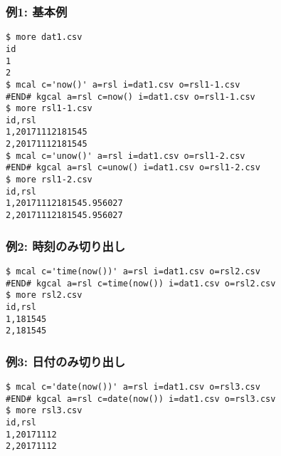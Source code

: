 \subsubsection*{例1: 基本例}



\begin{Verbatim}[baselinestretch=0.7,frame=single]
$ more dat1.csv
id
1
2
$ mcal c='now()' a=rsl i=dat1.csv o=rsl1-1.csv
#END# kgcal a=rsl c=now() i=dat1.csv o=rsl1-1.csv
$ more rsl1-1.csv
id,rsl
1,20171112181545
2,20171112181545
$ mcal c='unow()' a=rsl i=dat1.csv o=rsl1-2.csv
#END# kgcal a=rsl c=unow() i=dat1.csv o=rsl1-2.csv
$ more rsl1-2.csv
id,rsl
1,20171112181545.956027
2,20171112181545.956027
\end{Verbatim}
\subsubsection*{例2: 時刻のみ切り出し}



\begin{Verbatim}[baselinestretch=0.7,frame=single]
$ mcal c='time(now())' a=rsl i=dat1.csv o=rsl2.csv
#END# kgcal a=rsl c=time(now()) i=dat1.csv o=rsl2.csv
$ more rsl2.csv
id,rsl
1,181545
2,181545
\end{Verbatim}
\subsubsection*{例3: 日付のみ切り出し}



\begin{Verbatim}[baselinestretch=0.7,frame=single]
$ mcal c='date(now())' a=rsl i=dat1.csv o=rsl3.csv
#END# kgcal a=rsl c=date(now()) i=dat1.csv o=rsl3.csv
$ more rsl3.csv
id,rsl
1,20171112
2,20171112
\end{Verbatim}

